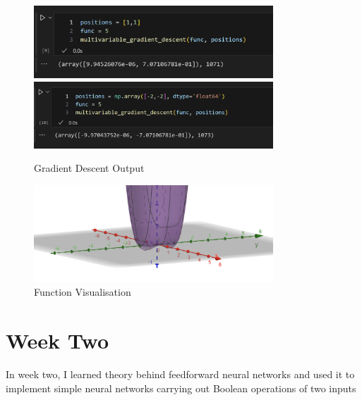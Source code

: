 \documentclass[12pt,a4paper]{article}
\begin{document}
\begin{itemize}
\begin{figure}[h!]
    \centering
    \includegraphics[width=0.8\textwidth]{grad2} 
    \includegraphics[width=0.8\textwidth]{grad3} 
    \caption{Gradient Descent Output}
    \label{fig:example}
\end{figure}
\begin{figure}[h!]
    \centering
    \includegraphics[width=0.8\textwidth]{grad4}
    \caption{Function Visualisation}
    \label{fig:example}
\end{figure}
\end{itemize}
\pagebreak
\section{Week Two}
In week two, I learned theory behind feedforward neural networks and used it to implement simple neural networks carrying out Boolean operations of two inputs
\end{document}
